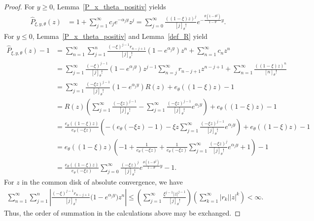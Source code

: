 \documentclass[12pt]{article}
\newcommand{\1}{\mathds{1}}
\theoremstyle{definition}
\theoremstyle{plain}
\theoremstyle{remark}
\begin{document}
\begin{proof}
    For $y\ge 0$, Lemma~\ref{P_x_theta_positiv} yields
    \begin{align*}
        \hat{P}_{\xi,y,\theta}(z)
        &=1+\sum_{j=1}^\infty c_je^{-\alpha_jy}z^j
        =\sum_{j=0}^\infty \frac{((1-\xi)z)^j}{[j]_\theta!}e^{-\frac{\theta(1-\theta^j)}{1-\theta}y}.
    \end{align*}
    For $y\le 0$, Lemma~\ref{P_x_theta_positiv} and Lemma~\ref{def_R} yield
    \begin{align*}
        \hat{P}_{\xi,y,\theta}(z)-1
        &=\sum_{n=1}^\infty \sum_{j=1}^n \frac{(-\xi)^{j-1} r_{n-j+1}}{[j]_\theta!} \left(1 - e^{\alpha_j y} \right)z^n+\sum_{n=1}^\infty c_nz^n
         \\&=\sum_{j=1}^\infty \frac{(-\xi)^{j-1}}{[j]_\theta!} \left(1 - e^{\alpha_j y} \right)z^{j-1}\sum_{n=j}^\infty r_{n-j+1}z^{n-j+1}+\sum_{n=1}^\infty \frac{((1-\xi)z)^n}{[n]_\theta!}
        \\&=\sum_{j=1}^\infty \frac{(-\xi z)^{j-1} }{[j]_\theta!} \left(1 - e^{\alpha_j y} \right)R(z)+e_\theta((1-\xi)z)-1
        \\&=R(z)\left(\sum_{j=1}^\infty \frac{(-\xi z)^{j-1} }{[j]_\theta!}-\sum_{j=1}^\infty \frac{(-\xi z)^{j-1}}{[j]_\theta!}e^{\alpha_j y}\right)+e_\theta((1-\xi)z)-1
        \\&= \frac{e_\theta((1-\xi)z)}{e_\theta(-\xi z)}\left(-(e_\theta(-\xi z)-1)-\xi z\sum_{j=1}^\infty \frac{(-\xi z)^{j-1}}{[j]_\theta!}e^{\alpha_j y}\right)+e_\theta((1-\xi)z)-1
        \\&=e_\theta((1-\xi)z)\left(-1+\frac{1}{e_\theta(-\xi z)}+ \frac{1}{e_\theta(-\xi z)}\sum_{j=1}^\infty \frac{(-\xi z)^{j}}{[j]_\theta!}e^{\alpha_j y}+1\right)-1
        \\&=\frac{e_\theta((1-\xi)z)}{e_\theta(-\xi z)}\sum_{j=0}^\infty \frac{(-\xi z)^{j}}{[j]_\theta!}e^{\frac{\theta(1-\theta^j)}{1-\theta}y}-1.%
    \end{align*}
   For $z$ in the common disk of absolute convergence, we have
\begin{align*}
    \sum_{n=1}^\infty\sum_{j=1}^n
    \left|\frac{(-\xi)^{j-1}r_{n-j+1}}{[j]_\theta!} \bigl(1-e^{\alpha_jy}\bigr)z^n
    \right|
    \leq\left(\sum_{j=1}^\infty\frac{\xi^{j-1}|z|^{j-1}}{[j]_\theta!}\right)
    \left( \sum_{k=1}^\infty |r_k||z|^k\right)
    <\infty.
\end{align*}
Thus, the order of summation in the calculations above may be exchanged. 
\end{proof}
\end{document}
